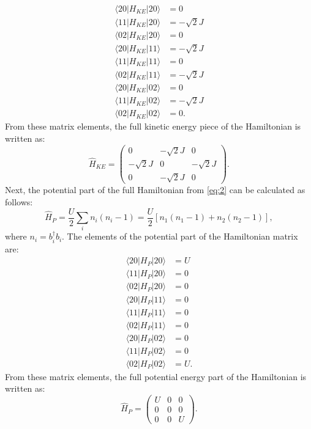 \begin{align*}
\langle{20|H_{KE}|20\rangle} &=0 \\
\langle{11|H_{KE}|20\rangle} &=-\sqrt{2}J \\
\langle{02|H_{KE}|20\rangle} &=0 \\
\langle{20|H_{KE}|11\rangle} &=-\sqrt{2}J \\
\langle{11|H_{KE}|11\rangle} &=0 \\
\langle{02|H_{KE}|11\rangle} &=-\sqrt{2}J \\
\langle{20|H_{KE}|02\rangle} &=0 \\
\langle{11|H_{KE}|02\rangle} &=-\sqrt{2}J \\
\langle{02|H_{KE}|02\rangle} &=0.
\end{align*}
\noindent From these matrix elements, the full kinetic energy piece of the Hamiltonian is written as:
\begin{equation}
\hat{H}_{KE} = \begin{pmatrix} 0 & -\sqrt{2}J & 0 \\ -\sqrt{2}J & 0 & -\sqrt{2}J \\ 0 & -\sqrt{2}J & 0 \end{pmatrix}.
\end{equation}
\noindent Next, the potential part of the full Hamiltonian from \cref{eq:2} can be calculated as follows:
\begin{equation}
\hat{H}_{P} = \frac{U}{2}\sum_i{n_i(n_i - 1)} = \frac{U}{2}[n_1(n_1 - 1) + n_2(n_2 - 1)],
\end{equation}
\noindent where $n_i = b_i^{\dagger}b_i$. The elements of the potential part of the Hamiltonian matrix are:
\begin{align*}
\langle{20|H_{P}|20\rangle} &=U \\
\langle{11|H_{P}|20\rangle} &=0 \\
\langle{02|H_{P}|20\rangle} &=0 \\
\langle{20|H_{P}|11\rangle} &=0 \\
\langle{11|H_{P}|11\rangle} &=0 \\
\langle{02|H_{P}|11\rangle} &=0 \\
\langle{20|H_{P}|02\rangle} &=0 \\
\langle{11|H_{P}|02\rangle} &=0 \\
\langle{02|H_{P}|02\rangle} &=U.
\end{align*}
\noindent From these matrix elements, the full potential energy part of the Hamiltonian is written as:
\begin{equation}
\hat{H}_{P} = \begin{pmatrix} U & 0 & 0 \\ 0 & 0 & 0 \\ 0 & 0 & U \end{pmatrix}.
\end{equation}
